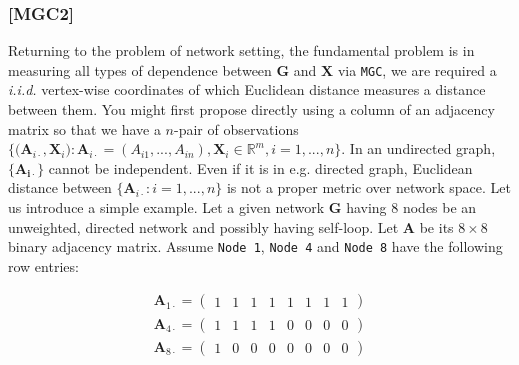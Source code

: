 \documentclass[12pt]{article}
\theoremstyle{definition}
\begin{document}
\subsubsection{[MGC2]}


Returning to the problem of network setting, the fundamental problem is in measuring all types of dependence between $\boldsymbol{G}$ and $\boldsymbol{X}$ via \texttt{MGC}, we are required a \textit{i.i.d.} vertex-wise coordinates of which Euclidean distance measures a distance between them. You might first propose directly using a column of an adjacency matrix so that we have a $n$-pair of observations $\big\{ \big( \boldsymbol{A}_{i \cdot} , \boldsymbol{X}_{i} \big) : \boldsymbol{A}_{i \cdot} = (A_{i 1} , ... , A_{i n} ), \boldsymbol{X}_{i} \in \mathbb{R}^{m}, i=1,...,n  \big\}.$ In an undirected graph, $\{ \mathbf{A_{i \cdot}}  \}$ cannot be independent. Even if it is in e.g. directed graph, Euclidean distance between $\{ \boldsymbol{A}_{i \cdot} : i =1, ... , n \}$ is not a proper metric over network space. Let us introduce a simple example. Let a given network $\boldsymbol{G}$ having 8 nodes be an unweighted, directed network and possibly having self-loop. Let $\boldsymbol{A}$ be its $8 \times 8$ binary adjacency matrix. Assume \texttt{Node 1}, \texttt{Node 4} and \texttt{Node 8} have the following row entries:

\begin{equation}
\begin{gathered}
\boldsymbol{A}_{1 \cdot} = \left( \begin{array}{rrrrrrrr} 1 & 1 & 1 & 1 & 1 & 1 & 1 & 1 \end{array} \right) \\
\boldsymbol{A}_{4 \cdot} = \left( \begin{array}{rrrrrrrr} 1 & 1 & 1 & 1 & 0 & 0 & 0 & 0 \end{array} \right) \\
\boldsymbol{A}_{8 \cdot} = \left( \begin{array}{rrrrrrrr} 1 & 0 & 0 & 0 & 0 & 0 & 0 & 0 \end{array} \right)
\end{gathered}
\end{equation}
\end{document}
